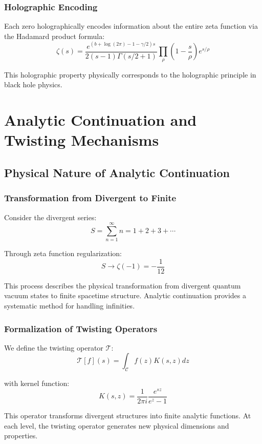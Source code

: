 \documentclass[11pt]{article}
\begin{document}
\subsubsection{Holographic Encoding}

Each zero holographically encodes information about the entire zeta function via the Hadamard product formula:
$$\zeta(s) = \frac{e^{(b + \log(2\pi) - 1 - \gamma/2)s}}{2(s-1)\Gamma(s/2 + 1)} \prod_{\rho} \left(1 - \frac{s}{\rho}\right) e^{s/\rho}$$

This holographic property physically corresponds to the holographic principle in black hole physics.

\section{Analytic Continuation and Twisting Mechanisms}

\subsection{Physical Nature of Analytic Continuation}

\subsubsection{Transformation from Divergent to Finite}

Consider the divergent series:
$$S = \sum_{n=1}^{\infty} n = 1 + 2 + 3 + \cdots$$

Through zeta function regularization:
$$S \rightarrow \zeta(-1) = -\frac{1}{12}$$

This process describes the physical transformation from divergent quantum vacuum states to finite spacetime structure. Analytic continuation provides a systematic method for handling infinities.

\subsubsection{Formalization of Twisting Operators}

We define the twisting operator $\mathcal{T}$:
$$\mathcal{T}[f](s) = \int_{\mathcal{C}} f(z) K(s,z) dz$$

with kernel function:
$$K(s,z) = \frac{1}{2\pi i} \frac{e^{sz}}{e^z - 1}$$

This operator transforms divergent structures into finite analytic functions. At each level, the twisting operator generates new physical dimensions and properties.
\end{document}
